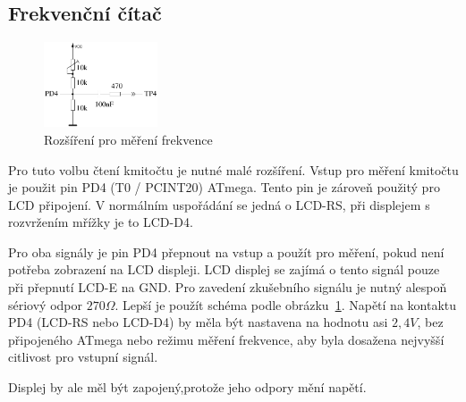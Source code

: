 \subsection{Frekvenční čítač}
\label{sec:frequency_counter}
 \begin{figure}
\vspace{-1\baselineskip}
\begin{center}
\includegraphics[width=0.3\textwidth]{../FIG/Frequency_addon.pdf}
\end{center}
\vspace{-0.6\baselineskip}
\caption{Rozšíření pro měření frekvence}
\vspace{-0.5\baselineskip}
\label{fig:FreqMes}
\end{figure}
Pro tuto volbu čtení kmitočtu je nutné malé rozšíření.
Vstup pro měření kmitočtu je použit pin PD4 (T0 / PCINT20) ATmega. Tento pin je zároveň použitý
pro LCD připojení.
V normálním uspořádání se jedná o LCD-RS, při displejem s rozvržením mřížky je to LCD-D4.

Pro oba signály je pin PD4 přepnout na vstup a použít pro měření,
pokud není potřeba zobrazení na LCD displeji.
LCD displej se zajímá  o tento signál pouze při přepnutí LCD-E na GND.
Pro zavedení zkušebního signálu je nutný alespoň sériový odpor \(270\Omega\).
Lepší je použít schéma podle obrázku~\ref{fig:FreqMes}.
Napětí na kontaktu PD4 (LCD-RS nebo LCD-D4) by měla být nastavena na hodnotu asi \(2,4V\),
bez připojeného ATmega nebo režimu měření frekvence,
aby byla dosažena nejvyšší citlivost pro vstupní signál.

Displej by ale měl být zapojený,protože jeho  odpory mění napětí.


